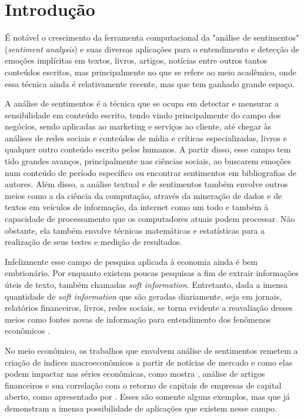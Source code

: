 \chapter{Introdução}
\label{chap:introducao}

É notável o crescimento da ferramenta computacional da "análise de sentimentos"  (\textit{sentiment analysis}) e suas diversas aplicações para o entendimento e detecção de emoções implícitas em textos, livros, artigos, notícias entre outros tantos conteúdos escritos, mas principalmente no que se refere ao meio acadêmico, onde essa técnica ainda é relativamente recente, mas que tem ganhado grande espaço.

A análise de sentimentos é a técnica que se ocupa em detectar e mensurar a sensibilidade em conteúdo escrito, tendo vindo principalmente do campo dos negócios, sendo aplicadas ao marketing e serviços ao cliente, até chegar às análises de redes sociais e conteúdos de mídia e críticas especializadas, livros e qualquer outro conteúdo escrito pelos humanos. A partir disso, esse campo tem tido grandes avanços, principalmente nas ciências sociais, ao buscarem emoções num conteúdo de período específico ou encontrar sentimentos em bibliografias de autores. Além disso, a análise textual e de sentimentos também envolve outros meios como a da ciência da computação, através da mineração de dados e de textos em veículos de informação, da internet como um todo e também à capacidade de processamento que os computadores atuais podem processar. Não obstante, ela também envolve técnicas matemáticas e estatísticas para a realização de seus testes e medição de resultados.

Infelizmente esse campo de pesquisa aplicada à economia ainda é bem embrionário. Por enquanto existem poucas pesquisas a fim de extrair informações úteis de texto, também chamadas \textit{soft information}. Entretanto, dada a imensa quantidade de \textit{soft information} que são geradas diariamente, seja em jornais, relatórios financeiros, livros, redes sociais, se torna evidente a reavaliação desses meios como fontes novas de informação para entendimento dos fenômenos econômicos \cite{shap-sud}.

No meio econômico, os trabalhos que envolvem análise de sentimentos remetem a criação de índices macroeconômicos a partir de notícias de mercado e como elas podem impactar nas séries econômicas, como mostra , análise de artigos financeiros e sua correlação com o retorno de capitais de empresas de capital aberto, como apresentado por . Esses são somente alguns exemplos, mas que já demonstram a imensa possibilidade de aplicações que existem nesse campo.  

